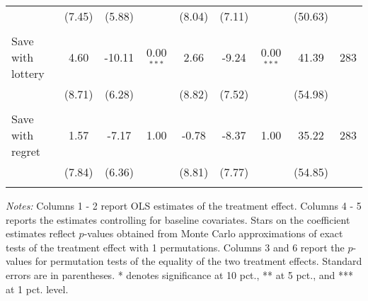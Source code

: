 \begin{table}[htbp]
{\begin{threeparttable}
\begin{tabular}{l*{8}{c}}
          &   (7.45)&   (5.88)&         &   (8.04)&   (7.11)&         &  (50.63)&         \\
          &         &         &         &         &         &         &         &         \\
Save with lottery&     4.60&   -10.11&0.00$^{***}$&     2.66&    -9.24&0.00$^{***}$&    41.39&      283\\
          &   (8.71)&   (6.28)&         &   (8.82)&   (7.52)&         &  (54.98)&         \\
          &         &         &         &         &         &         &         &         \\
Save with regret&     1.57&    -7.17&     1.00&    -0.78&    -8.37&     1.00&    35.22&      283\\
          &   (7.84)&   (6.36)&         &   (8.81)&   (7.77)&         &  (54.85)&         \\
          &         &         &         &         &         &         &         &         \\
\bottomrule \end{tabular} \begin{tablenotes}[flushleft] \footnotesize \item \emph{Notes:} Columns 1 - 2 report OLS estimates of the treatment effect. Columns 4 - 5 reports the estimates controlling for baseline covariates. Stars on the coefficient estimates reflect \(p\)-values obtained from Monte Carlo approximations of exact tests of the treatment effect with 1 permutations. Columns 3 and 6 report the \(p\)-values for permutation tests of the equality of the two treatment effects. Standard errors are in parentheses. * denotes significance at 10 pct., ** at 5 pct., and *** at 1 pct. level. \end{tablenotes} \end{threeparttable} } \end{table}

